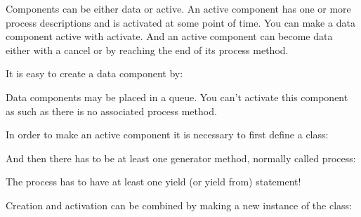 \documentclass[letterpaper,10pt,english]{sphinxmanual}
\begin{document}
Components can be either data or active. An active component has one or more process descriptions and is activated
at some point of time. You can make a data component active with activate. And an active component can become
data either with a cancel or by reaching the end of its process method.

It is easy to create a data component by:

\begin{sphinxVerbatim}[commandchars=\\\{\}]
  
\end{sphinxVerbatim}

Data components may be placed in a queue. You can’t activate this component as such as there is no associated process method.

In order to make an active component it is necessary to first define a class:

\begin{sphinxVerbatim}[commandchars=\\\{\}]
 
\end{sphinxVerbatim}

And then there has to be at least one generator method, normally called process:

\begin{sphinxVerbatim}[commandchars=\\\{\}]
 
     
         
\end{sphinxVerbatim}

The process has to have at least one yield (or yield from) statement!

Creation and activation can be combined by making a new instance of the class:

\begin{sphinxVerbatim}[commandchars=\\\{\}]
  
  
  
\end{sphinxVerbatim}
\end{document}
